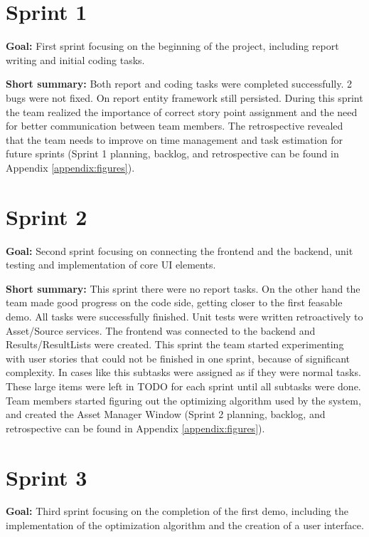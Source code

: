 
\section{Sprint 1}
\textbf{Goal:} First sprint focusing on the beginning of the project, including report writing and initial coding tasks.

\medskip
\noindent \textbf{Short summary:} Both report and coding tasks were completed successfully. 2 bugs were not fixed. On report
entity framework still persisted. During this sprint the team realized the importance of correct story point assignment and the need for better communication between team members. The retrospective revealed that the team needs to improve on time management and task estimation for future sprints (Sprint 1 planning, backlog, and retrospective can be found in Appendix \ref{appendix:figures}).

\section{Sprint 2}
\textbf{Goal:} Second sprint focusing on connecting the frontend and the backend, unit testing and implementation of core UI elements.

\medskip
\noindent \textbf{Short summary:} This sprint there were no report tasks. On the other hand the team made good progress on the code side,
getting closer to the first feasable demo. All tasks were successfully finished. Unit tests were written retroactively to Asset/Source services. The frontend was connected to the backend and Results/ResultLists were created. 
This sprint the team started experimenting with user stories that could not be finished in one sprint, because of significant complexity.
In cases like this subtasks were assigned as if they were normal tasks. These large items were left in TODO for each sprint until all
subtasks were done. Team members started figuring out the optimizing algorithm used by the system, and created the Asset Manager Window (Sprint 2 planning, backlog, and retrospective can be found in Appendix \ref{appendix:figures}).

\section{Sprint 3}
\textbf{Goal:} Third sprint focusing on the completion of the first demo, including the implementation of the optimization algorithm and the creation of a user interface.

